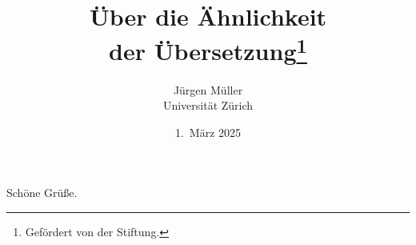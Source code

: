 \documentclass{article}
\title{Über die Ähnlichkeit\\ der \"Ubersetzung\thanks{Gef\"ordert von der Stiftung.}}
\author{Jürgen Müller\\ Universität Zürich}
\date{1.~März 2025}
\begin{document}
\maketitle
Schöne Grüße.
\end{document}
